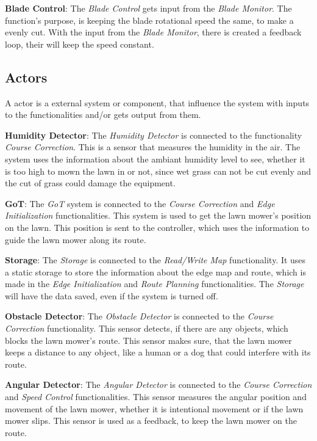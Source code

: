 \textbf{Blade Control}:
The \textit{Blade Control} gets input from the \textit{Blade Monitor}. The function's purpose, is keeping the blade rotational speed the same, to make a evenly cut. With the input from the \textit{Blade Monitor}, there is created a feedback loop, their will keep the speed constant.

\subsection{Actors}

A actor is a external system or component, that influence the system with inputs to the functionalities and/or gets output from them.

\textbf{Humidity Detector}:
The \textit{Humidity Detector} is connected to the functionality \textit{Course Correction}. This is a sensor that measures the humidity in the air. The system uses the information about the ambiant humidity level to see, whether it is too high to mown the lawn in or not, since wet grass can not be cut evenly and the cut of grass could damage the equipment. 

\textbf{GoT}:
The \textit{GoT} system is connected to the \textit{Course Correction} and \textit{Edge Initialization} functionalities. This system is used to get the lawn mower's position on the lawn. This position is sent to the controller, which uses the information to guide the lawn mower along its route.

\textbf{Storage}:
The \textit{Storage} is connected to the \textit{Read/Write Map} functionality. It uses a static storage to store the information about the edge map and route, which is made in the \textit{Edge Initialization} and \textit{Route Planning} functionalities. The \textit{Storage} will have the data saved, even if the system is turned off.

\textbf{Obstacle Detector}:
The \textit{Obstacle Detector} is connected to the \textit{Course Correction} functionality. This sensor detects, if there are any objects, which blocks the lawn mower's route. This sensor makes sure, that the lawn mower keeps a distance to any object, like a human or a dog that could interfere with its route.

\textbf{Angular Detector}:
The \textit{Angular Detector} is connected to the \textit{Course Correction} and \textit{Speed Control} functionalities. This sensor measures the angular position and movement of the lawn mower, whether it is intentional movement or if the lawn mower slips. This sensor is used as a feedback, to keep the lawn mower on the route.


